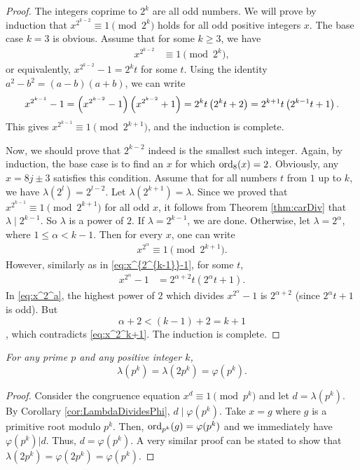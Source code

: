 \documentclass{subfile}
\begin{document}
	\begin{proof}
		The integers coprime to $2^k$ are all odd numbers. We will prove by induction that $x^{2^{k-2}} \equiv1\pmod{2^k}$ holds for all odd positive integers $x$. The base case $k=3$ is obvious. Assume that for some $k\geq 3$, we have
			\begin{align*}
				x^{2^{k-2}} & \equiv1\pmod{2^k},
			\end{align*}
		or equivalently, $x^{2^{k-2}} -1=2^kt$ for some $t$. Using the identity $a^2-b^2=(a-b)(a+b)$, we can write
			\begin{align}
				x^{2^{k-1}} -1 = \left(x^{2^{k-2}} -1\right)\left(x^{2^{k-2}} +1\right) = 2^kt\left(2^kt +2\right) = 2^{k+1}t \left(2^{k-1}t+1\right). \label{eq:x^{2^{k-1}}-1}
			\end{align}
		This gives $x^{2^{k-1}} \equiv 1\pmod{2^{k+1}}$, and the induction is complete.
		
		Now, we should prove that $2^{k-2}$ indeed is the smallest such integer. Again, by induction, the base case is to find an $x$ for which $\operatorname{ord}_8(x)=2$. Obviously, any $x=8j\pm3$ satisfies this condition. Assume that for all numbers $t$ from $1$ up to $k$, we have $\lambda(2^l)=2^{l-2}$. Let $\lambda(2^{k+1})=\lambda$. Since we proved that $x^{2^{k-1}} \equiv 1\pmod{2^{k+1}}$ for all odd $x$, it follows from Theorem \ref{thm:carDiv} that $\lambda \mid 2^{k-1}$. So $\lambda$ is a power of $2$. If $\lambda = 2^{k-1}$, we are done. Otherwise, let $\lambda=2^\alpha$, where $1 \leq \alpha <k-1$. Then for every $x$, one can write
			\begin{align}\label{eq:x^2^k+1}
				x^{2^\alpha} \equiv 1 \pmod{2^{k+1}}.
			\end{align}
		However, similarly as in \eqref{eq:x^{2^{k-1}}-1}, for some $t$,
			\begin{align}\label{eq:x^2^a}
				x^{2^{\alpha}} -1 &= 2^{\alpha+2}t \left(2^{\alpha}t+1\right).
			\end{align}
		In \eqref{eq:x^2^a}, the highest power of $2$ which divides $x^{2^{\alpha}} -1$ is $2^{\alpha+2}$ (since $2^{\alpha}t+1$ is odd). But $$\alpha+2 <(k-1)+2=k+1$$, which contradicts \eqref{eq:x^2^k+1}. The induction is complete.
	\end{proof}
	
	\begin{theorem}\slshape
		For any prime $p$ and any positive integer $k$, 
		\[\lambda(p^k)=\lambda(2p^k)=\varphi(p^k).\]
	\end{theorem}
	
	\begin{proof}
		Consider the congruence equation $x^d\equiv1\pmod{p^k}$ and let $d=\lambda(p^k)$. By Corollary \ref{cor:LambdaDividesPhi}, $d \mid \varphi(p^k)$. Take $x=g$ where $g$ is a primitive root modulo $p^k$. Then, $\operatorname{ord}_{p^k}(g)=\varphi(p^k)$ and we immediately have $\varphi(p^k)|d$. Thus, $d=\varphi(p^k)$. A very similar proof can be stated to show that $\lambda (2p^k)=\varphi (2p^k) = \varphi(p^k)$.
	\end{proof}
	
\end{document}

